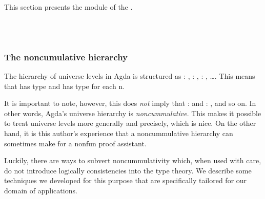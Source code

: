 This section presents the \Lifts module of the \agdaualib.
\ccpad
\begin{code}%
\>[0]\AgdaSymbol{\{-\#}\AgdaSpace{}%
\AgdaSpace{}%
\AgdaSpace{}%
\AgdaSpace{}%
\AgdaSpace{}%
\AgdaSymbol{\#-\}}\<%
%
\ccpad
%
\\[\AgdaEmptyExtraSkip]%
\>[0]\AgdaSpace{}%
\AgdaSpace{}%
\<%
%
\ccpad
%
\\[\AgdaEmptyExtraSkip]%
\>[0]\AgdaSpace{}%
\AgdaSpace{}%
\AgdaSpace{}%
\<%
\end{code}

\subsubsection{The noncumulative hierarchy}\label{the-noncumulative-hierarchy}
The hierarchy of universe levels in Agda is structured as  \as : , \hskip3mm  \as : , \hskip3mm  \as : , \ldots{}. This means that  has type   and  has type   for each \ab n.

It is important to note, however, this does \emph{not} imply that  \as :  and  \as : , and so on. In other words, Agda's universe hierarchy is \emph{noncummulative}. This makes it possible to treat universe levels more generally and precisely, which is nice. On the other hand, it is this author's experience that a noncummulative hierarchy can sometimes make for a nonfun proof assistant.

Luckily, there are ways to subvert noncummulativity which, when used with care, do not introduce logically consistencies into the type theory. We describe some techniques we developed for this purpose that are specifically tailored for our domain of applications.

